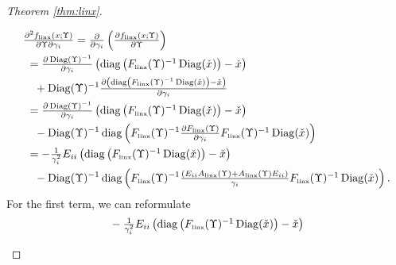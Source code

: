 \documentclass[smallextended]{svjour3hack}       %
\DeclareMathOperator{\Diag}{Diag}
\DeclareMathOperator{\diag}{diag}
\begin{document}
\begin{proof}[Theorem \ref{thm:linx}]
\begin{itemize}
\begin{align*}
    &\textstyle\frac{\partial^2 f_{{\tiny\mbox{linx}}}\left(x;\Upsilon\right)}{\partial \Upsilon \partial \gamma_i}=\textstyle\frac{\partial}{\partial\gamma_i}\left(\frac{\partial f_{{\tiny\mbox{linx}}}\left(x;\Upsilon\right)}{\partial \Upsilon}\right)\\
    & ~= \textstyle\frac{\partial \Diag(\Upsilon)^{-1}}{\partial\gamma_i} \left(\diag\left(F_{{\tiny\mbox{linx}}}(\Upsilon)^{-1}\Diag(\check{x})\right)-\check{x}\right)\\
    &\quad +\Diag(\Upsilon)^{-1}  \textstyle\frac{\partial \left(\diag\left(F_{{\tiny\mbox{linx}}}(\Upsilon)^{-1}\Diag(\check{x})\right)-\check{x} \right)}{\partial\gamma_i} \\
    & ~ =\textstyle\frac{\partial \Diag(\Upsilon)^{-1}}{\partial\gamma_i}\left(\diag\left(F_{{\tiny\mbox{linx}}}(\Upsilon)^{-1}\Diag(\check{x})\right)-\check{x}\right)\\
    &\quad -\Diag(\Upsilon)^{-1}  \diag\left(F_{{\tiny\mbox{linx}}}(\Upsilon)^{-1} \textstyle\frac{\partial F_{{\tiny\mbox{linx}}}(\Upsilon)}{\partial\gamma_i}F_{{\tiny\mbox{linx}}}(\Upsilon)^{-1}\Diag(\check{x})\right) \\
    &~= -\textstyle\frac{1}{\gamma_i^2}E_{ii}\left(\diag\left(F_{{\tiny\mbox{linx}}}(\Upsilon)^{-1}\Diag(\check{x})\right)-\check{x}\right)\\
    &\quad -\Diag(\Upsilon)^{-1}\diag\left(F_{{\tiny\mbox{linx}}}(\Upsilon)^{-1}\textstyle\frac{\left(E_{ii}A_{{\tiny\mbox{linx}}}(\Upsilon)+A_{{\tiny\mbox{linx}}}(\Upsilon) E_{ii}\right)}{\gamma_i}
    F_{{\tiny\mbox{linx}}}(\Upsilon)^{-1}\Diag(\check{x})\right).
\end{align*}
 For the first term, we can reformulate
 \begin{align*}
    & -\textstyle\frac{1}{\gamma_i^2}E_{ii}\left(\diag\left(F_{{\tiny\mbox{linx}}}(\Upsilon)^{-1}\Diag(\check{x})\right)-\check{x}\right)\\

\end{align*}
\end{itemize}
\end{proof}
\end{document}
